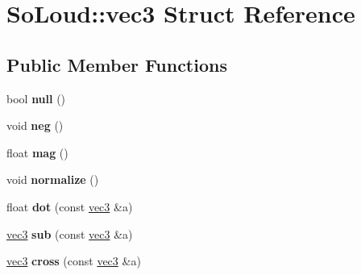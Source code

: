 \hypertarget{struct_so_loud_1_1vec3}{}\section{So\+Loud\+::vec3 Struct Reference}
\label{struct_so_loud_1_1vec3}
\subsection*{Public Member Functions}
\begin{DoxyCompactItemize}
\item 
\mbox{\label{struct_so_loud_1_1vec3_ac17cad1676d46287780c86440c1cc023}} 
bool {\bfseries null} ()
\item 
\mbox{\label{struct_so_loud_1_1vec3_a20ff63e115b18c4ef2ce31619570a8a8}} 
void {\bfseries neg} ()
\item 
\mbox{\label{struct_so_loud_1_1vec3_a4dd92fcf79b3933d7bf9772e01b68c7d}} 
float {\bfseries mag} ()
\item 
\mbox{\label{struct_so_loud_1_1vec3_a76f81d5ca0dd6d7c79155bb4505f6930}} 
void {\bfseries normalize} ()
\item 
\mbox{\label{struct_so_loud_1_1vec3_acca4007a2e0056879caf2f91c7a35b9e}} 
float {\bfseries dot} (const \mbox{\hyperlink{struct_so_loud_1_1vec3}{vec3}} \&a)
\item 
\mbox{\label{struct_so_loud_1_1vec3_ae36d3726714bdb7d131937c089d77cb4}} 
\mbox{\hyperlink{struct_so_loud_1_1vec3}{vec3}} {\bfseries sub} (const \mbox{\hyperlink{struct_so_loud_1_1vec3}{vec3}} \&a)
\item 
\mbox{\label{struct_so_loud_1_1vec3_a2d0840e99cf4016834949b9f6fe49614}} 
\mbox{\hyperlink{struct_so_loud_1_1vec3}{vec3}} {\bfseries cross} (const \mbox{\hyperlink{struct_so_loud_1_1vec3}{vec3}} \&a)
\end{DoxyCompactItemize}
